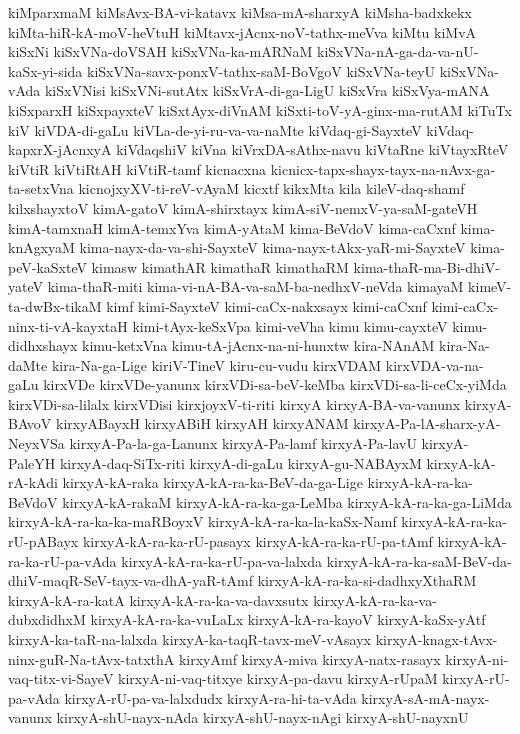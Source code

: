 {kiMparxmaM
kiMsAvx-BA-vi-katavx
kiMsa-mA-sharxyA
kiMsha-badxkekx
kiMta-hiR-kA-moV-heVtuH
kiMtavx-jAcnx-noV-tathx-meVva
kiMtu
kiMvA
kiSxNi
kiSxVNa-doVSAH
kiSxVNa-ka-mARNaM
kiSxVNa-nA-ga-da-va-nU-kaSx-yi-sida
kiSxVNa-savx-ponxV-tathx-saM-BoVgoV
kiSxVNa-teyU
kiSxVNa-vAda
kiSxVNisi
kiSxVNi-sutAtx
kiSxVrA-di-ga-LigU
kiSxVra
kiSxVya-mANA
kiSxparxH
kiSxpayxteV
kiSxtAyx-diVnAM
kiSxti-toV-yA-ginx-ma-rutAM
kiTuTx
kiV
kiVDA-di-gaLu
kiVLa-de-yi-ru-va-va-naMte
kiVdaq-gi-SayxteV
kiVdaq-kapxrX-jAcnxyA
kiVdaqshiV
kiVna
kiVrxDA-sAthx-navu
kiVtaRne
kiVtayxRteV
kiVtiR
kiVtiRtAH
kiVtiR-tamf
kicnacxna
kicnicx-tapx-shayx-tayx-na-nAvx-ga-ta-setxVna
kicnojxyXV-ti-reV-vAyaM
kicxtf
kikxMta
kila
kileV-daq-shamf
kilxshayxtoV
kimA-gatoV
kimA-shirxtayx
kimA-siV-nemxV-ya-saM-gateVH
kimA-tamxnaH
kimA-temxYva
kimA-yAtaM
kima-BeVdoV
kima-caCxnf
kima-knAgxyaM
kima-nayx-da-va-shi-SayxteV
kima-nayx-tAkx-yaR-mi-SayxteV
kima-peV-kaSxteV
kimasw
kimathAR
kimathaR
kimathaRM
kima-thaR-ma-Bi-dhiV-yateV
kima-thaR-miti
kima-vi-nA-BA-va-saM-ba-nedhxV-neVda
kimayaM
kimeV-ta-dwBx-tikaM
kimf
kimi-SayxteV
kimi-caCx-nakxsayx
kimi-caCxnf
kimi-caCx-ninx-ti-vA-kayxtaH
kimi-tAyx-keSxVpa
kimi-veVha
kimu
kimu-cayxteV
kimu-didhxshayx
kimu-ketxVna
kimu-tA-jAcnx-na-ni-hunxtw
kira-NAnAM
kira-Na-daMte
kira-Na-ga-Lige
kiriV-TineV
kiru-cu-vudu
kirxVDAM
kirxVDA-va-na-gaLu
kirxVDe
kirxVDe-yanunx
kirxVDi-sa-beV-keMba
kirxVDi-sa-li-ceCx-yiMda
kirxVDi-sa-lilalx
kirxVDisi
kirxjoyxV-ti-riti
kirxyA
kirxyA-BA-va-vanunx
kirxyA-BAvoV
kirxyABayxH
kirxyABiH
kirxyAH
kirxyANAM
kirxyA-Pa-lA-sharx-yA-NeyxVSa
kirxyA-Pa-la-ga-Lanunx
kirxyA-Pa-lamf
kirxyA-Pa-lavU
kirxyA-PaleYH
kirxyA-daq-SiTx-riti
kirxyA-di-gaLu
kirxyA-gu-NABAyxM
kirxyA-kA-rA-kAdi
kirxyA-kA-raka
kirxyA-kA-ra-ka-BeV-da-ga-Lige
kirxyA-kA-ra-ka-BeVdoV
kirxyA-kA-rakaM
kirxyA-kA-ra-ka-ga-LeMba
kirxyA-kA-ra-ka-ga-LiMda
kirxyA-kA-ra-ka-ka-maRBoyxV
kirxyA-kA-ra-ka-la-kaSx-Namf
kirxyA-kA-ra-ka-rU-pABayx
kirxyA-kA-ra-ka-rU-pasayx
kirxyA-kA-ra-ka-rU-pa-tAmf
kirxyA-kA-ra-ka-rU-pa-vAda
kirxyA-kA-ra-ka-rU-pa-va-lalxda
kirxyA-kA-ra-ka-saM-BeV-da-dhiV-maqR-SeV-tayx-va-dhA-yaR-tAmf
kirxyA-kA-ra-ka-si-dadhxyXthaRM
kirxyA-kA-ra-katA
kirxyA-kA-ra-ka-va-davxsutx
kirxyA-kA-ra-ka-va-dubxdidhxM
kirxyA-kA-ra-ka-vuLaLx
kirxyA-kA-ra-kayoV
kirxyA-kaSx-yAtf
kirxyA-ka-taR-na-lalxda
kirxyA-ka-taqR-tavx-meV-vAsayx
kirxyA-knagx-tAvx-ninx-guR-Na-tAvx-tatxthA
kirxyAmf
kirxyA-miva
kirxyA-natx-rasayx
kirxyA-ni-vaq-titx-vi-SayeV
kirxyA-ni-vaq-titxye
kirxyA-pa-davu
kirxyA-rUpaM
kirxyA-rU-pa-vAda
kirxyA-rU-pa-va-lalxdudx
kirxyA-ra-hi-ta-vAda
kirxyA-sA-mA-nayx-vanunx
kirxyA-shU-nayx-nAda
kirxyA-shU-nayx-nAgi
kirxyA-shU-nayxnU
}
